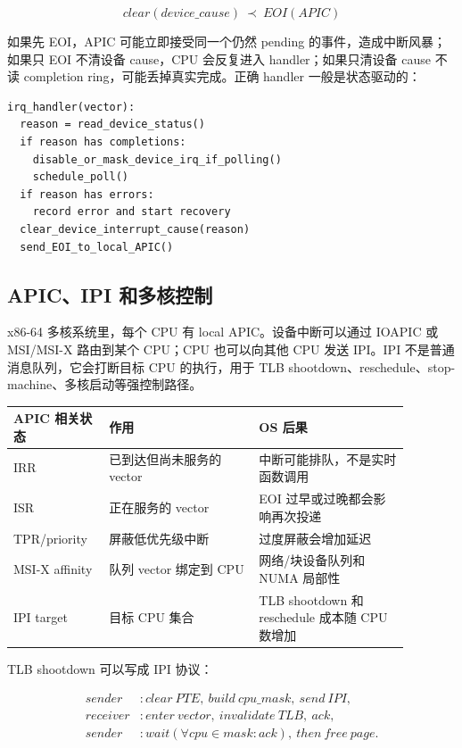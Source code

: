 \[
clear(device\_cause)\ \prec\ EOI(APIC)
\]

如果先 EOI，APIC 可能立即接受同一个仍然 pending 的事件，造成中断风暴；如果只 EOI 不清设备 cause，CPU 会反复进入 handler；如果只清设备 cause 不读 completion ring，可能丢掉真实完成。正确 handler 一般是状态驱动的：

\begin{lstlisting}
irq_handler(vector):
  reason = read_device_status()
  if reason has completions:
    disable_or_mask_device_irq_if_polling()
    schedule_poll()
  if reason has errors:
    record error and start recovery
  clear_device_interrupt_cause(reason)
  send_EOI_to_local_APIC()
\end{lstlisting}

\subsection{APIC、IPI 和多核控制}

x86-64 多核系统里，每个 CPU 有 local APIC。设备中断可以通过 IOAPIC 或 MSI/MSI-X 路由到某个 CPU；CPU 也可以向其他 CPU 发送 IPI。IPI 不是普通消息队列，它会打断目标 CPU 的执行，用于 TLB shootdown、reschedule、stop-machine、多核启动等强控制路径。

\begin{longtable}{p{0.20\linewidth}p{0.34\linewidth}p{0.34\linewidth}}
\toprule
APIC 相关状态 & 作用 & OS 后果 \\
\midrule
IRR & 已到达但尚未服务的 vector & 中断可能排队，不是实时函数调用 \\
ISR & 正在服务的 vector & EOI 过早或过晚都会影响再次投递 \\
TPR/priority & 屏蔽低优先级中断 & 过度屏蔽会增加延迟 \\
MSI-X affinity & 队列 vector 绑定到 CPU & 网络/块设备队列和 NUMA 局部性 \\
IPI target & 目标 CPU 集合 & TLB shootdown 和 reschedule 成本随 CPU 数增加 \\
\bottomrule
\end{longtable}

TLB shootdown 可以写成 IPI 协议：

\[
\begin{aligned}
sender &: clear\ PTE,\ build\ cpu\_mask,\ send\ IPI,\\
receiver &: enter\ vector,\ invalidate\ TLB,\ ack,\\
sender &: wait(\forall cpu\in mask: ack),\ then\ free\ page.
\end{aligned}
\]

